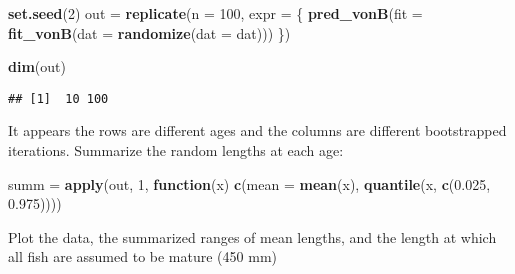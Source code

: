 \documentclass[]{book}
\newenvironment{Shaded}{\begin{snugshade}}{\end{snugshade}}
\newcommand{\KeywordTok}[1]{\textcolor[rgb]{0.13,0.29,0.53}{\textbf{#1}}}
\newcommand{\DataTypeTok}[1]{\textcolor[rgb]{0.13,0.29,0.53}{#1}}
\newcommand{\DecValTok}[1]{\textcolor[rgb]{0.00,0.00,0.81}{#1}}
\newcommand{\FloatTok}[1]{\textcolor[rgb]{0.00,0.00,0.81}{#1}}
\newcommand{\StringTok}[1]{\textcolor[rgb]{0.31,0.60,0.02}{#1}}
\newcommand{\ControlFlowTok}[1]{\textcolor[rgb]{0.13,0.29,0.53}{\textbf{#1}}}
\newcommand{\OperatorTok}[1]{\textcolor[rgb]{0.81,0.36,0.00}{\textbf{#1}}}
\newcommand{\NormalTok}[1]{#1}
\theoremstyle{definition}
\theoremstyle{definition}
\theoremstyle{definition}
\theoremstyle{remark}
\begin{document}
\begin{Shaded}
\begin{Highlighting}[]
\KeywordTok{set.seed}\NormalTok{(}\DecValTok{2}\NormalTok{)}
\NormalTok{out =}\StringTok{ }\KeywordTok{replicate}\NormalTok{(}\DataTypeTok{n =} \DecValTok{100}\NormalTok{, }\DataTypeTok{expr =}\NormalTok{ \{}
  \KeywordTok{pred_vonB}\NormalTok{(}\DataTypeTok{fit =} \KeywordTok{fit_vonB}\NormalTok{(}\DataTypeTok{dat =} \KeywordTok{randomize}\NormalTok{(}\DataTypeTok{dat =}\NormalTok{ dat)))}
\NormalTok{\})}

\KeywordTok{dim}\NormalTok{(out)}
\end{Highlighting}
\end{Shaded}

\begin{verbatim}
## [1]  10 100
\end{verbatim}

It appears the rows are different ages and the columns are different
bootstrapped iterations. Summarize the random lengths at each age:

\begin{Shaded}
\begin{Highlighting}[]
\NormalTok{summ =}\StringTok{ }\KeywordTok{apply}\NormalTok{(out, }\DecValTok{1}\NormalTok{, }\ControlFlowTok{function}\NormalTok{(x) }\KeywordTok{c}\NormalTok{(}\DataTypeTok{mean =} \KeywordTok{mean}\NormalTok{(x), }\KeywordTok{quantile}\NormalTok{(x, }\KeywordTok{c}\NormalTok{(}\FloatTok{0.025}\NormalTok{, }\FloatTok{0.975}\NormalTok{))))}
\end{Highlighting}
\end{Shaded}

Plot the data, the summarized ranges of mean lengths, and the length at
which all fish are assumed to be mature (450 mm)

\begin{Shaded}
\end{Shaded}
\end{document}
